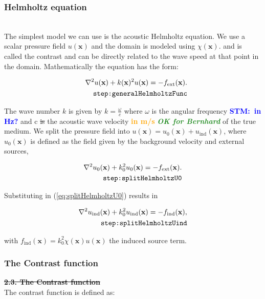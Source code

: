\documentclass[10pt,a4paper]{article}
\newcommand{\commentstm}[1]{\textcolor{blue}{\textbf{STM:\ #1}}}
\newcommand{\newstmtwo}[1]{\textcolor{orange}{\textbf{#1}}}
\newcommand{\oldstm}[1]{\sout{#1}}
\newcommand{\oldstmtwo}[1]{\xout{#1}}
\newcommand{\brok}{\textcolor{ForestGreen}{\textit{\textbf{OK for Bernhard}}}}
\begin{document}
\subsubsection{Helmholtz equation}
\oldstmtwo{\textbf{2.2 Helmholtz equation}}\\
The simplest model we can use is the acoustic Helmholtz equation. We
use a scalar pressure field $u(\mathbf{x})$ and the domain is modeled
using $\chi(\mathbf{x})$. and is called the contrast and can be
directly related to the wave speed at that point in the domain.
Mathematically the equation has the form:

\begin{align} \label{eq:generalHelmholtzFunc}
\nabla^2 u(\mathbf{x}) + k(\mathbf{x})^2 u(\mathbf{x}) =
-f_{\text{ext}}(\mathbf{x}).\\
\tag*{\texttt{step:generalHelmholtzFunc}}
\end{align}

The wave number $k$ is given by $k = \frac{\omega}{c}$ where $\omega$
is the angular frequency \commentstm{in Hz?}  and c \oldstm{is} the
acoustic wave velocity \newstmtwo{in m/s} {\brok} of the true medium.
We split the pressure field into $u(\mathbf{x}) = u_0(\mathbf{x}) +
u_{\text{ind}}(\mathbf{x})$, where $u_0(\mathbf{x})$ is defined as the
field given by the background velocity and external sources,

\begin{align} \label{eq:splitHelmholtzU0}
\nabla^2 u_0(\mathbf{x}) + k_0^2 u_0(\mathbf{x}) = -f_{\text{ext}}(\mathbf{x}).\\
\tag*{\texttt{step:splitHelmholtzU0}}
\end{align}

Substituting in (\ref{eq:splitHelmholtzU0}) results in

\begin{align} \label{eq:splitHelmholtzUind}
\nabla^2 u_\text{ind}(\mathbf{x}) + k_0^2 u_\text{ind}(\mathbf{x}) =
-f_\text{ind}(\mathbf{x}),\\
\tag*{\texttt{step:splitHelmholtzUind}}
\end{align}

with $f_\text{ind}(\mathbf{x}) = k_0^2 \chi(\mathbf{x}) u(\mathbf{x})$
the induced source term.


\subsubsection{The Contrast function}
\oldstm{\textbf{2.3. The Contrast function}}\\
The contrast function is defined as:
\end{document}
